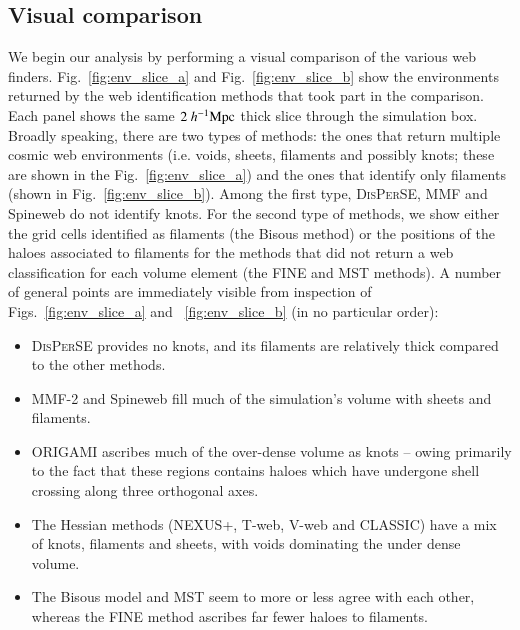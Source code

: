 \documentclass[useAMS,usenatbib]{mnras}
\def\hmpc{~h^{-1}\rm Mpc}
\newcommand{\bisous}{Bisous}
\newcommand{\classic}{\textsc{CLASSIC}}
\newcommand{\disperse}{\textsc{DisPerSE}}
\newcommand{\fine}{\textsc{FINE}}
\newcommand{\origami}{\textsc{ORIGAMI}}
\newcommand{\mst}{\textsc{MST}}
\newcommand{\nexus}{\textsc{NEXUS+}}
\newcommand{\tweb}{T-web}
\newcommand{\vweb}{V-web}
\newcommand{\mmft}{\textsc{MMF-2}}
\newcommand{\spine}{Spineweb}
\begin{document}
\subsection{Visual comparison}
\label{sec:cube}
We begin our analysis by performing a visual comparison of the various web finders. Fig.~\ref{fig:env_slice_a} and Fig.~\ref{fig:env_slice_b} show the environments returned by the web identification methods that took part in the comparison. Each panel shows the same $2\hmpc$ thick slice through the simulation box. Broadly speaking, there are two types of methods: the ones that return multiple cosmic web environments (i.e. voids, sheets, filaments and possibly knots; these are shown in the Fig.~\ref{fig:env_slice_a}) and the ones that identify only filaments (shown in Fig.~\ref{fig:env_slice_b}). Among the first type, \disperse{}, MMF and Spineweb do not identify knots. For the second type of methods, we show either the grid cells identified as filaments (the \bisous{} method) or the positions of the haloes associated to filaments for the methods that did not return a web classification for each volume element (the \fine{} and \mst{} methods). A number of general points are immediately visible from inspection of Figs.~\ref{fig:env_slice_a} and ~\ref{fig:env_slice_b} (in no particular order): 
\begin{itemize}
\item \disperse{} provides no knots, and its filaments are relatively thick compared to the other methods.
\item \mmft{} and \spine{} fill much of the simulation's volume with sheets and filaments.
\item \origami{} ascribes much of the over-dense volume as knots -- owing primarily to the fact that these regions contains haloes which have undergone shell crossing along three orthogonal axes.
\item The Hessian methods (\nexus{}, \tweb{}, \vweb{} and \classic{}) have a mix of knots, filaments and sheets, with voids dominating the under dense volume.
\item The \bisous{} model and \mst{} seem to more or less agree with each other, whereas the \fine{} method ascribes far fewer haloes to filaments.
\end{itemize} 
\end{document}
